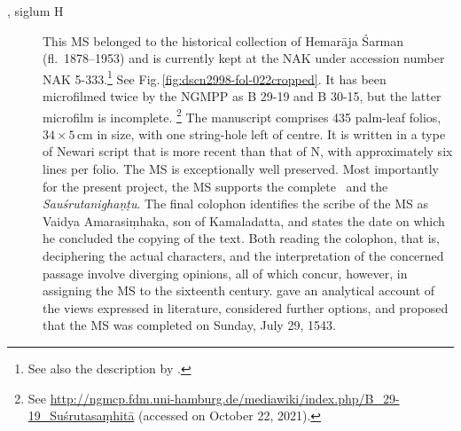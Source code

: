 \begin{description}
    \goodbreak \item[\MS{Kathmandu NAK 5-333}, siglum H]  This MS belonged to the
    historical collection of Hemarāja Śarman (fl.\ 1878--1953) and is currently
    kept at the NAK under accession number NAK 5-333.\footnote{See also the description by 
    \cite[\S 2.3]{kleb-2021b}.} See
    Fig.\,\ref{fig:dscn2998-fol-022cropped}. It has been microfilmed twice by the
    NGMPP as B 29-19 and B 30-15, but the latter microfilm is incomplete.%
    \footnote{%
    See 
    \url{http://ngmcp.fdm.uni-hamburg.de/mediawiki/index.php/B_29-19_Suśrutasaṃhitā} 
    (accessed on October 22, 2021). } The manuscript comprises 435 palm-leaf folios, 
    $34\times5$\,cm in size, with one string-hole left of centre. It is written in a type of 
    Newari script that is more recent than that of N, with approximately six lines per 
    folio. The MS is exceptionally well preserved.  Most importantly for the present 
    project, the MS supports the complete \SS\ and the \emph{Sauśrutanighaṇṭu}. The 
    final colophon identifies the scribe of the MS as Vaidya Amarasiṃhaka, son of 
    Kamaladatta, and states the date on which he concluded the copying of the text. 
    Both reading the colophon, that is, deciphering the actual characters, and the 
    interpretation of the concerned passage involve diverging opinions, all of which 
    concur, however, in assigning the MS to the sixteenth century. 
    \textcite[21--26]{kleb-2021b} gave an analytical account of the views expressed in 
    literature, considered further options, and proposed that the MS was completed on 
    Sunday, July 29, 1543.
\end{description}
%  

